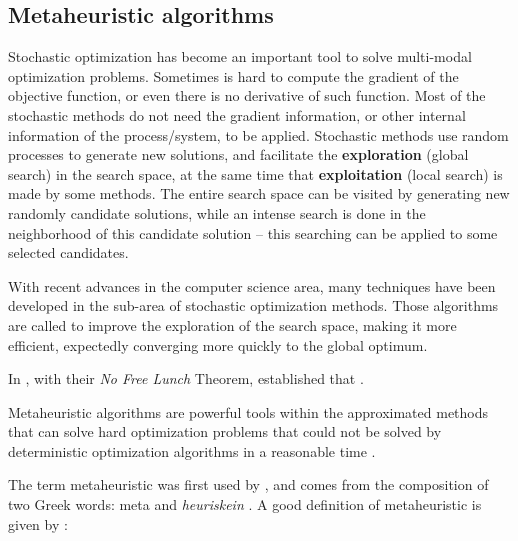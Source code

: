 \subsection{Metaheuristic algorithms}

Stochastic optimization has become an important tool to solve multi-modal optimization problems. Sometimes is hard to compute the gradient of the objective function, or even there is no derivative of such function. Most of the stochastic methods do not need the gradient information, or other internal information of the process/system, to be applied. Stochastic methods use random processes to generate new solutions, and facilitate the \textbf{exploration} (global search) in the search space, at the same time that \textbf{exploitation} (local search) is made by some methods. The entire search space can be visited by generating new randomly candidate solutions, while an intense search is done in the neighborhood of this candidate solution -- this searching can be applied to some selected candidates.

With recent advances in the computer science area, many techniques have been developed in the sub-area of stochastic optimization methods. Those algorithms are called to improve the exploration of the search space, making it more efficient, expectedly converging more quickly to the global optimum.

In , with their \textit{No Free Lunch} Theorem, established that .

Metaheuristic algorithms are powerful tools within the approximated methods that can solve hard optimization problems that could not be solved by deterministic optimization algorithms in a reasonable time \cite{yang2010nature, lin2012review}.

The term metaheuristic was first used by , and comes from the composition of two Greek words: meta and \textit{heuriskein} . A good definition of metaheuristic is given by :

\begin{quote}
\end{quote}

